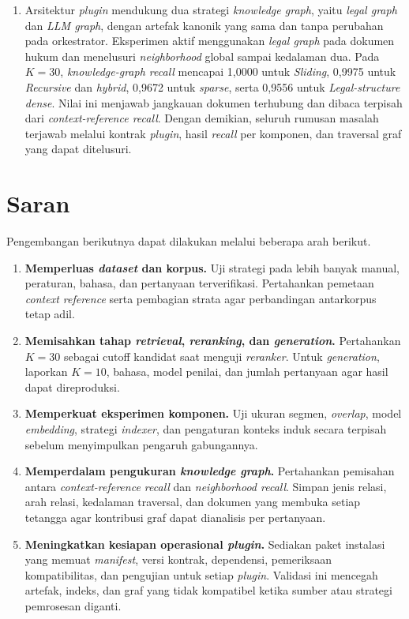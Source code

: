 \begin{enumerate}
  \item Arsitektur \emph{plugin} mendukung dua strategi
  \emph{knowledge graph}, yaitu \emph{legal graph} dan \emph{LLM graph}, dengan artefak kanonik
  yang sama dan tanpa perubahan pada orkestrator. Eksperimen aktif menggunakan \emph{legal graph}
  pada dokumen hukum dan menelusuri \emph{neighborhood} global sampai kedalaman dua. Pada
  \(K = 30\), \emph{knowledge-graph recall} mencapai 1,0000 untuk \emph{Sliding}, 0,9975 untuk
  \emph{Recursive} dan \emph{hybrid}, 0,9672 untuk \emph{sparse}, serta 0,9556 untuk
  \emph{Legal-structure dense}. Nilai ini menjawab jangkauan dokumen terhubung dan dibaca
  terpisah dari \emph{context-reference recall}. Dengan demikian, seluruh rumusan masalah
  terjawab melalui kontrak \emph{plugin}, hasil \emph{recall} per komponen, dan traversal graf
  yang dapat ditelusuri.
\end{enumerate}

\section{Saran}
\label{sec:saran}

\noindent Pengembangan berikutnya dapat dilakukan melalui beberapa arah berikut.

\begin{enumerate}
  \item \textbf{Memperluas \emph{dataset} dan korpus.} Uji strategi pada lebih banyak manual,
  peraturan, bahasa, dan pertanyaan terverifikasi. Pertahankan pemetaan \emph{context reference} serta
  pembagian strata agar perbandingan antarkorpus tetap adil.

  \item \textbf{Memisahkan tahap \emph{retrieval}, \emph{reranking}, dan \emph{generation}.}
  Pertahankan \(K = 30\) sebagai cutoff kandidat saat menguji \emph{reranker}. Untuk
  \emph{generation}, laporkan \(K = 10\), bahasa, model penilai, dan jumlah pertanyaan agar
  hasil dapat direproduksi.

  \item \textbf{Memperkuat eksperimen komponen.} Uji ukuran segmen, \emph{overlap}, model
  \emph{embedding}, strategi \emph{indexer}, dan pengaturan konteks induk secara terpisah sebelum
  menyimpulkan pengaruh gabungannya.

  \item \textbf{Memperdalam pengukuran \emph{knowledge graph}.} Pertahankan pemisahan antara
  \emph{context-reference recall} dan \emph{neighborhood recall}. Simpan jenis relasi, arah relasi,
  kedalaman traversal, dan dokumen yang membuka setiap tetangga agar kontribusi graf dapat
  dianalisis per pertanyaan.

  \item \textbf{Meningkatkan kesiapan operasional \emph{plugin}.} Sediakan paket instalasi yang
  memuat \emph{manifest}, versi kontrak, dependensi, pemeriksaan kompatibilitas, dan pengujian
  untuk setiap \emph{plugin}. Validasi ini mencegah artefak, indeks, dan graf yang tidak kompatibel
  ketika sumber atau strategi pemrosesan diganti.
\end{enumerate}
